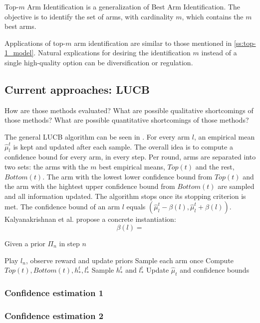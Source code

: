 Top-$m$ Arm Identification is a generalization of Best Arm Identification. The objective is to identify the set of arms, with cardinality $m$, which contains the $m$ best arms.

Applications of top-$m$ arm identification are similar to those mentioned in \ref{ss:top-1_model}. Natural explications for desiring the identification $m$ instead of a single high-quality option can be diversification or regulation.

\subsection{Current approaches: LUCB}
How are those methods evaluated?
What are possible qualitative shortcomings of those methods?
What are possible quantitative shortcomings of those methods?

The general LUCB algorithm can be seen in . For every arm $l$, an empirical mean $\hat{\mu}_l^t$ is kept and updated after each sample. The overall idea is to compute a confidence bound for every arm, in every step. Per round, arms are separated into two sets: the arms with the $m$ best empirical means, $Top(t)$ and the rest, $Bottom(t)$. The arm with the lowest lower confidence bound from $Top(t)$ and the arm with the hightest upper confidence bound from $Bottom(t)$ are sampled and all information updated.
The algorithm stops once its stopping criterion is met. The confidence bound of an arm $l$ equals $(\hat{\mu}_l^t - \beta(l), \hat{\mu}_l^t + \beta(l))$.
Kalyanakrishnan et al. \cite{DBLP:conf/icml/KalyanakrishnanTAS12} propose a concrete instantiation:
\[\beta(l) = \]

\begin{algorithm}[H]
    \caption{Given a prior $\Pi_n$ in step $n$}
    \label{alg:LUCB1}
  \begin{algorithmic}
    \State Play $l_n$, observe reward and update priors
    \State Sample each arm once
    \Repeat
      \State Compute $Top(t), Bottom(t), h_*^t, l_*^t$
      \State Sample $h_*^t$ and $l_*^t$
      \State Update $\hat{\mu}_t$ and confidence bounds
    \Until{$ \mu < \epsilon$}
  \end{algorithmic}
\end{algorithm}


\subsubsection{Confidence estimation 1}
\subsubsection{Confidence estimation 2}

